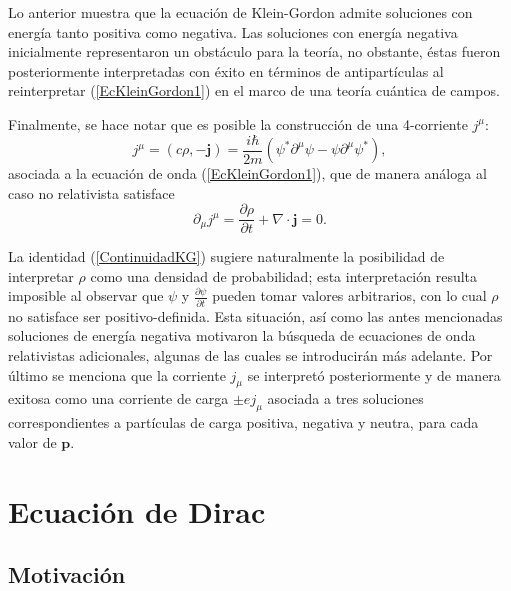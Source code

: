 Lo anterior muestra que la ecuación de Klein-Gordon admite soluciones con energía tanto positiva como negativa. Las soluciones con energía negativa inicialmente representaron un obstáculo para la teoría, no obstante, éstas fueron posteriormente interpretadas con éxito en términos de antipartículas al reinterpretar (\ref{EcKleinGordon1}) en el marco de una teoría cuántica de campos.

Finalmente, se hace notar que es posible la construcción de una 4-corriente $j^\mu$:
\begin{equation}\label{CorrienteKG}
 j^\mu=(c\rho,-\mathbf{j})=\frac{i\hbar}{2m}(\psi^* \partial^\mu \psi-\psi \partial^\mu \psi^*),
\end{equation}
asociada a la ecuación de onda (\ref{EcKleinGordon1}), que de manera análoga al caso no relativista satisface
\begin{equation}\label{ContinuidadKG}
 \partial_\mu j^\mu=\frac{\partial \rho}{\partial t}+\nabla\cdot \mathbf{j}=0.
\end{equation}

La identidad (\ref{ContinuidadKG})  sugiere naturalmente 
la posibilidad de interpretar $\rho$ como una densidad de probabilidad; esta interpretación resulta imposible al observar que $\psi$ y $\frac{\partial \psi}{\partial t}$ 
pueden tomar valores arbitrarios, con lo cual $\rho$ no satisface ser positivo-definida. Esta situación, así como las antes mencionadas soluciones de energía negativa motivaron 
la búsqueda de ecuaciones de onda relativistas adicionales, algunas de las cuales se introducirán más adelante. Por último se menciona que la corriente $j_\mu$ se 
interpretó posteriormente y de manera exitosa como una corriente de carga $\pm ej_\mu$ asociada a tres soluciones correspondientes a partículas de carga positiva, 
negativa y neutra, para cada valor de $\mathbf{p}$.\cite[cap. 1]{GreinerRQM}


\section{Ecuación de Dirac}
\label{sec:EcDirac}

\subsection{Motivación}
\label{subsec:IntroduccionDirac}

